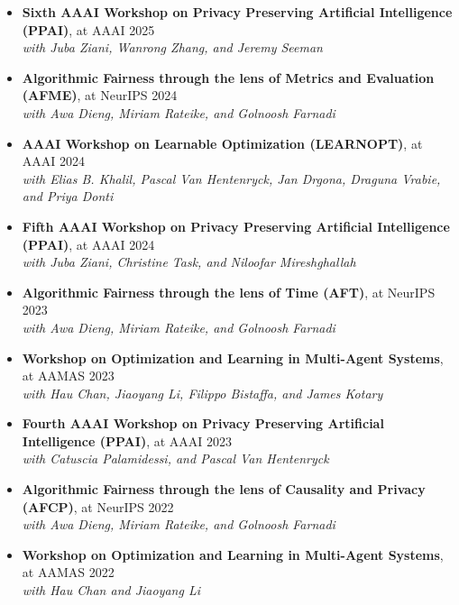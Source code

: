   \begin{itemize}
    \item 
    {\bf Sixth AAAI Workshop on Privacy Preserving Artificial Intelligence (PPAI)}, at AAAI   \hfill{2025}
    \\{\em with Juba Ziani, Wanrong Zhang, and Jeremy Seeman}

    \item
    {\bf Algorithmic Fairness through the lens of Metrics and Evaluation (AFME)}, at NeurIPS \hfill {2024}
    \\{\em with Awa Dieng, Miriam Rateike, and Golnoosh Farnadi}

    \item 
    {\bf AAAI Workshop on Learnable Optimization (LEARNOPT)}, at AAAI   \hfill{2024}
    \\{\em with Elias B. Khalil, Pascal Van Hentenryck, Jan Drgona, Draguna Vrabie, and Priya Donti}

    \item 
    {\bf Fifth AAAI Workshop on Privacy Preserving Artificial Intelligence (PPAI)}, at AAAI   \hfill{2024}
    \\{\em with Juba Ziani, Christine Task, and Niloofar Mireshghallah}

    \item
    {\bf Algorithmic Fairness through the lens of Time (AFT)}, at NeurIPS \hfill {2023}
    \\{\em with Awa Dieng, Miriam Rateike, and Golnoosh Farnadi}

    \item 
    {\bf Workshop on Optimization and Learning in Multi-Agent Systems}, at AAMAS \hfill{2023}
    \\{\em with Hau Chan, Jiaoyang Li, Filippo Bistaffa, and James Kotary}

    \item 
    {\bf Fourth AAAI Workshop on Privacy Preserving Artificial Intelligence (PPAI)}, at AAAI   \hfill{2023}
    \\{\em with Catuscia Palamidessi, and Pascal Van Hentenryck}

    \item
    {\bf Algorithmic Fairness through the lens of Causality and Privacy (AFCP)}, at NeurIPS \hfill {2022}
    \\{\em with Awa Dieng, Miriam Rateike, and Golnoosh Farnadi}

    \item 
    {\bf Workshop on Optimization and Learning in Multi-Agent Systems}, at AAMAS \hfill{2022}
    \\{\em with Hau Chan and Jiaoyang Li}


\end{itemize}
